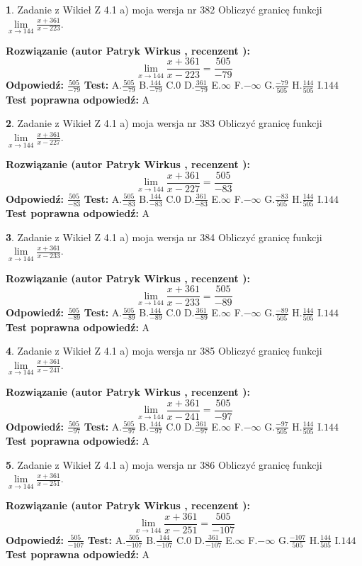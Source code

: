 \documentclass[12pt, a4paper]{article}
\theoremstyle{definition} %
\newtheorem{zad}{}
\newcommand{\zadStart}[1]{\begin{zad}#1\newline}
\newcommand{\zadStop}{\end{zad}}
\newcommand{\rozwStart}[2]{\noindent \textbf{Rozwiązanie (autor #1 , recenzent #2): }\newline}
\newcommand{\rozwStop}{\newline}
\newcommand{\odpStart}{\noindent \textbf{Odpowiedź:}\newline}
\newcommand{\odpStop}{\newline}
\newcommand{\testStart}{\noindent \textbf{Test:}\newline}
\newcommand{\testStop}{\newline}
\newcommand{\kluczStart}{\noindent \textbf{Test poprawna odpowiedź:}\newline}
\newcommand{\kluczStop}{\newline}
\begin{document}
\zadStart{Zadanie z Wikieł Z 4.1 a) moja wersja nr 382}
Obliczyć granicę funkcji $\lim\limits_{x\to144}\frac{x+361}{x-223}$.
\zadStop
\rozwStart{Patryk Wirkus}{}
$$\lim\limits_{x\to144}\frac{x+361}{x-223} = \frac{505}{-79}$$
\rozwStop
\odpStart
$\frac{505}{-79}$
\odpStop
\testStart
A.$\frac{505}{-79}$
B.$\frac{144}{-79}$
C.$0$
D.$\frac{361}{-79}$
E.$\infty$
F.$-\infty$
G.$\frac{-79}{505}$
H.$\frac{144}{505}$
I.$144$
\testStop
\kluczStart
A
\kluczStop



\zadStart{Zadanie z Wikieł Z 4.1 a) moja wersja nr 383}
Obliczyć granicę funkcji $\lim\limits_{x\to144}\frac{x+361}{x-227}$.
\zadStop
\rozwStart{Patryk Wirkus}{}
$$\lim\limits_{x\to144}\frac{x+361}{x-227} = \frac{505}{-83}$$
\rozwStop
\odpStart
$\frac{505}{-83}$
\odpStop
\testStart
A.$\frac{505}{-83}$
B.$\frac{144}{-83}$
C.$0$
D.$\frac{361}{-83}$
E.$\infty$
F.$-\infty$
G.$\frac{-83}{505}$
H.$\frac{144}{505}$
I.$144$
\testStop
\kluczStart
A
\kluczStop



\zadStart{Zadanie z Wikieł Z 4.1 a) moja wersja nr 384}
Obliczyć granicę funkcji $\lim\limits_{x\to144}\frac{x+361}{x-233}$.
\zadStop
\rozwStart{Patryk Wirkus}{}
$$\lim\limits_{x\to144}\frac{x+361}{x-233} = \frac{505}{-89}$$
\rozwStop
\odpStart
$\frac{505}{-89}$
\odpStop
\testStart
A.$\frac{505}{-89}$
B.$\frac{144}{-89}$
C.$0$
D.$\frac{361}{-89}$
E.$\infty$
F.$-\infty$
G.$\frac{-89}{505}$
H.$\frac{144}{505}$
I.$144$
\testStop
\kluczStart
A
\kluczStop



\zadStart{Zadanie z Wikieł Z 4.1 a) moja wersja nr 385}
Obliczyć granicę funkcji $\lim\limits_{x\to144}\frac{x+361}{x-241}$.
\zadStop
\rozwStart{Patryk Wirkus}{}
$$\lim\limits_{x\to144}\frac{x+361}{x-241} = \frac{505}{-97}$$
\rozwStop
\odpStart
$\frac{505}{-97}$
\odpStop
\testStart
A.$\frac{505}{-97}$
B.$\frac{144}{-97}$
C.$0$
D.$\frac{361}{-97}$
E.$\infty$
F.$-\infty$
G.$\frac{-97}{505}$
H.$\frac{144}{505}$
I.$144$
\testStop
\kluczStart
A
\kluczStop



\zadStart{Zadanie z Wikieł Z 4.1 a) moja wersja nr 386}
Obliczyć granicę funkcji $\lim\limits_{x\to144}\frac{x+361}{x-251}$.
\zadStop
\rozwStart{Patryk Wirkus}{}
$$\lim\limits_{x\to144}\frac{x+361}{x-251} = \frac{505}{-107}$$
\rozwStop
\odpStart
$\frac{505}{-107}$
\odpStop
\testStart
A.$\frac{505}{-107}$
B.$\frac{144}{-107}$
C.$0$
D.$\frac{361}{-107}$
E.$\infty$
F.$-\infty$
G.$\frac{-107}{505}$
H.$\frac{144}{505}$
I.$144$
\testStop
\kluczStart
A
\kluczStop
\end{document}
